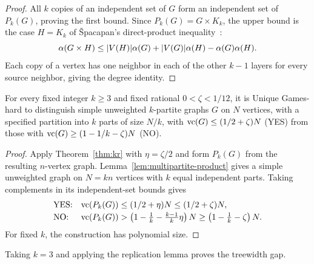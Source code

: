 \begin{proof}
All $k$ copies of an independent set of $G$ form an independent
set of $P_k(G)$, proving the first bound. Since $P_k(G)=G\times K_k$,
the upper bound is the case $H=K_k$ of \v{S}pacapan's
direct-product inequality~\cite{Spacapan2011}:
\[
 \alpha(G\times H)\leq
 |V(H)|\alpha(G)+|V(G)|\alpha(H)-\alpha(G)\alpha(H).
\]
Each copy of a vertex has one neighbor in each of the other
$k-1$ layers for every source neighbor, giving the degree identity.
\end{proof}

\begin{theorem}
\label{thm:ugc-tripartite-cover}
For every fixed integer $k\geq3$ and fixed rational
$0<\zeta<1/12$, it is Unique Games-hard
to distinguish simple unweighted $k$-partite graphs $G$ on $N$
vertices, with a specified partition into $k$ parts of size $N/k$,
with $\operatorname{vc}(G)\leq(1/2+\zeta)N$ \textup{(YES)} from those with
$\operatorname{vc}(G)\geq(1-1/k-\zeta)N$ \textup{(NO)}.
\end{theorem}

\begin{proof}
Apply Theorem~\ref{thm:kr} with $\eta=\zeta/2$ and form $P_k(G)$
from the resulting $n$-vertex graph. Lemma~\ref{lem:multipartite-product}
gives a simple unweighted graph on $N=kn$ vertices with $k$ equal
independent parts. Taking complements in its independent-set bounds gives
\[
\begin{array}{ll}
\textup{YES:}&\operatorname{vc}(P_k(G))\leq(1/2+\eta)N\leq(1/2+\zeta)N,\\[2pt]
\textup{NO:}&\operatorname{vc}(P_k(G))>
\left(1-\frac1k-\frac{k-1}{k}\eta\right)N
\geq\left(1-\frac1k-\zeta\right)N.
\end{array}
\]
For fixed $k$, the construction has polynomial size.
\end{proof}

Taking $k=3$ and applying the replication lemma proves the treewidth gap.

